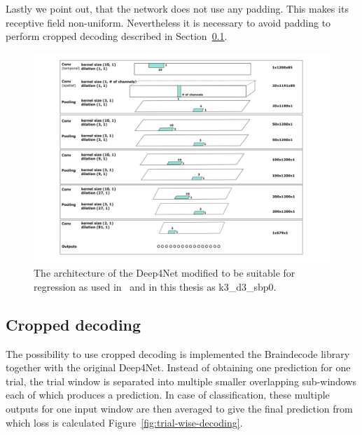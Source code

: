 Lastly we point out, that the network does not use any padding. 
This makes its receptive field non-uniform.
Nevertheless it is necessary to avoid padding to perform cropped decoding described in Section~\ref{subsec:cropped-decoding}.

\begin{figure}[!htbp]
\centering
\includegraphics[width=\linewidth]{img/ch3/architektura}
\caption[Deep4Net architecture]{The architecture of the Deep4Net modified to be suitable for regression as used in~\cite{Hammer-2021} and in this thesis as k3\_d3\_sbp0.}
\label{fig:architecture}
\end{figure}

\subsection{Cropped decoding}\label{subsec:cropped-decoding}
The possibility to use cropped decoding is implemented the Braindecode library together with the original Deep4Net.
Instead of obtaining one prediction for one trial, the trial window is separated into multiple smaller overlapping sub-windows each of which produces a prediction.
In case of classification, these multiple outputs for one input window are then averaged to give the final prediction from which loss is calculated Figure~\ref{fig:trial-wise-decoding}.

